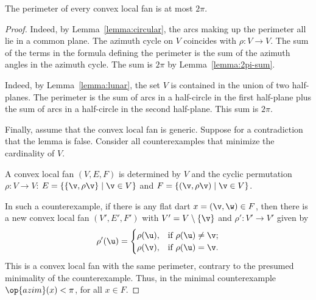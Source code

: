 \begin{lemma}[]\label{lemma:convex-hyp}
The perimeter of every convex local fan is at most $2\pi$.  
\end{lemma}
%
%

\begin{proof} 
  Indeed, by Lemma~\ref{lemma:circular},
the arcs making up the perimeter all lie in a common plane.  The
azimuth cycle on $V$ coincides with $\rho:V\to V$.  The sum of the
terms in the formula defining the perimeter is the sum of the
azimuth angles in the azimuth cycle.  The sum is $2\pi$ by
Lemma~\ref{lemma:2pi-sum}.


  Indeed, by Lemma~\ref{lemma:lunar}, the
set $V$ is contained in the union of two half-planes.  The perimeter
is the sum of arcs in a half-circle in the first half-plane plus the
sum of arcs in a half-circle in the second half-plane. This sum is
$2\pi$.

Finally, assume that the convex local fan is generic.  Suppose for a
contradiction that the lemma is false.  Consider all counterexamples
that minimize the cardinality of $V$.  

A convex local fan $(V,E,F)$ is determined by $V$ and the cyclic
permutation $\rho:V\to V$: $E=\{\{\v,\rho \v\}\mid \v\in V\}$ and $F
= \{(\v,\rho \v)\mid \v\in V\}$.

In such a counterexample, if there is any flat dart
$x=(\v,\w)\in F$, then there is a new convex local fan $(V',E',F')$ with $V' = V\setminus\{\v\}$ and $\rho':V'\to V'$
given by
\begin{displaymath}
\rho'(\u) = \begin{cases}
\rho(\u), & \text{if } \rho(\u)\ne \v;\\
\rho(\v), & \text{if }\rho(\u) = \v.\\
\end{cases}
\end{displaymath}
This is a convex local fan with the same perimeter, contrary to the presumed
minimality of the counterexample.  Thus, in the minimal counterexample
$\op{azim}(x) <\pi$, for all $x\in F$.


\end{proof}
